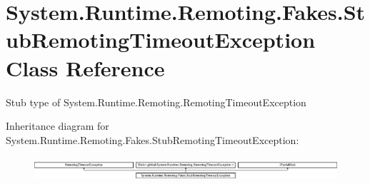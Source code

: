 \hypertarget{class_system_1_1_runtime_1_1_remoting_1_1_fakes_1_1_stub_remoting_timeout_exception}{\section{System.\-Runtime.\-Remoting.\-Fakes.\-Stub\-Remoting\-Timeout\-Exception Class Reference}
\label{class_system_1_1_runtime_1_1_remoting_1_1_fakes_1_1_stub_remoting_timeout_exception}
}


Stub type of System.\-Runtime.\-Remoting.\-Remoting\-Timeout\-Exception 


Inheritance diagram for System.\-Runtime.\-Remoting.\-Fakes.\-Stub\-Remoting\-Timeout\-Exception\-:\begin{figure}[H]
\begin{center}
\leavevmode
\includegraphics[height=0.919540cm]{class_system_1_1_runtime_1_1_remoting_1_1_fakes_1_1_stub_remoting_timeout_exception}
\end{center}
\end{figure}
